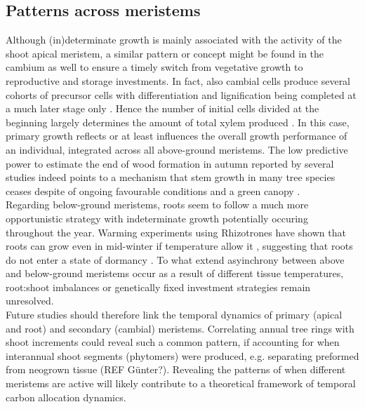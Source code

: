 \documentclass{article}
\begin{document}
\subsection*{Patterns across meristems} %
Although (in)determinate growth is mainly associated with the activity of the shoot apical meristem, a similar pattern or concept might be found in the cambium as well to ensure a timely switch from vegetative growth to reproductive and storage investments. In fact, also cambial cells produce several cohorts of precursor cells with differentiation and lignification being completed at a much later stage only \citep{valdovinos-ayalaSeasonalPatternsIncreases2022}. Hence the number of initial cells divided at the beginning largely determines the amount of total xylem produced \cite{lupiXylemPhenologyWood2010}. In this case, primary growth reflects or at least influences the overall growth performance of an individual, integrated across all above-ground meristems. The low predictive power to estimate the end of wood formation in autumn reported by several studies \cite{buttoComparingCellDynamics2020} indeed points to a mechanism that stem growth in many tree species ceases despite of ongoing favourable conditions and a  green canopy \cite{arendStemGrowthPhenology2024}.\\

Regarding below-ground meristems, roots seem to follow a much more opportunistic strategy with indeterminate growth potentially occuring throughout the year. Warming experiments using Rhizotrones have shown that roots can grow even in mid-winter if temperature allow it \cite{lyfordControlledGrowthForest1966}, suggesting that roots do not enter a state of dormancy \cite{radvilleRootPhenologyChanging2016}. To what extend asyinchrony between above and below-ground meristems occur as a result of different tissue temperatures, root:shoot imbalances or genetically fixed investment strategies remain unresolved\cite{abramoffAreBelowgroundPhenology2015, makotoSynchronousAsynchronousRoot2020}.\\

 Future studies should therefore link the temporal dynamics of primary (apical and root) and secondary (cambial) meristems. Correlating annual tree rings with shoot increments could reveal such a common pattern, if accounting for when interannual shoot segments (phytomers) were produced, e.g. separating preformed from neogrown tissue (REF Günter?). Revealing the patterns of when different meristems are active will likely contribute to a theoretical framework of temporal carbon allocation dynamics.
\end{document}
